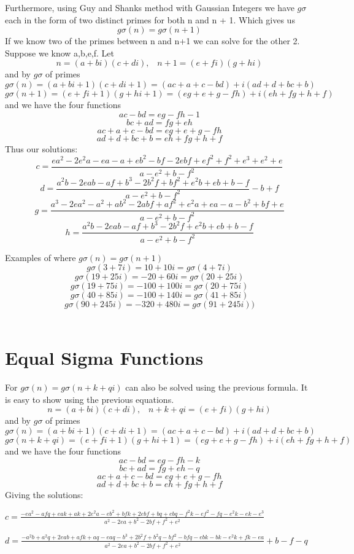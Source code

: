 \documentclass[12pt]{amsart}
\begin{document}
Furthermore, using Guy and Shanks method with Gaussian Integers we have $g\sigma$ each in the form of two distinct primes for both n and n + 1. Which gives us $$g\sigma(n) = g\sigma(n+1)$$ If we know two of the primes between n and n+1 we can solve for the other 2. Suppose we know a,b,e,f.
Let $$n = (a + bi)(c+di), \; \; \; n+1 = (e + fi)(g + hi)$$ and by $g\sigma$ of primes  $$ g\sigma(n) = (a + bi + 1)(c + di + 1) = (ac + a + c -bd) + i(ad + d + bc + b)$$ $$ g\sigma(n+1) = (e + fi + 1)(g + hi + 1) = (eg + e + g - fh) + i(eh + fg + h + f)$$ and we have the four functions $$ac -bd = eg -fh - 1$$ $$bc + ad = fg + eh$$ $$ac + a + c -bd = eg + e + g - fh$$ $$ad + d + bc + b = eh + fg + h + f$$
Thus our solutions: 
$$c = \frac{ea^2 - 2e^2a -ea -a + eb^2 -bf -2ebf + ef^2 + f^2 + e^3 + e^2 + e} {a-e^2+b-f^2}$$ 
$$d = \frac{a^2b - 2eab -af +b^3 -2b^2f + bf^2 + e^2b + eb + b - f}{a-e^2 + b -f^2} -b + f$$ 
$$g = \frac{a^3 -2ea^2 - a^2 + ab^2 - 2abf + af^2 + e^2a + ea - a -b^2 + bf + e} {a-e^2+b-f^2}$$ 
$$h = \frac{a^2b - 2eab -af + b^3 - 2b^2f + e^2b + eb +b -f} {a-e^2+b-f^2}$$


Examples of where $g\sigma(n) = g\sigma(n+1)$
\\
$$g\sigma(3 + 7i) = 10 + 10i = g\sigma(4 + 7i)$$
$$g\sigma(19 + 25i) = -20 + 60i = g\sigma(20 + 25i)$$
$$g\sigma(19 + 75i) = -100 + 100i = g\sigma(20 + 75i)$$
$$g\sigma(40 + 85i) = -100 + 140i  = g\sigma(41 + 85i)$$
$$g\sigma(90 + 245i) = -320 + 480i  = g\sigma(91 + 245i))$$
\\

\section{Equal Sigma Functions}
For $g\sigma(n) = g\sigma(n+k+qi)$ can also be solved using the previous formula. It is easy to show using the previous equations. 
$$n = (a + bi)(c+di), \; \; \; n+k+qi = (e + fi)(g + hi)$$ and by $g\sigma$ of primes $$ g\sigma(n) = (a + bi + 1)(c + di + 1) = (ac + a + c -bd) + i(ad + d + bc + b)$$ $$ g\sigma(n+k+qi) = (e + fi + 1)(g + hi + 1) = (eg + e + g - fh) + i(eh + fg + h + f)$$ and we have the four functions $$ac -bd = eg -fh - k$$ $$bc + ad = fg + eh - q$$ $$ac + a + c -bd = eg + e + g - fh$$ $$ad + d + bc + b = eh + fg + h + f$$
Giving the solutions:

$c = \frac{-ea^2 -afq + eak + ak + 2e^2a -eb^2 + bfk + 2ebf + bq + ebq -f^2k -ef^2 -fq-e^2k -ek -e^3}{a^2-2ea+b^2-2bf+f^2+e^2}$

$d = \frac{-a^2b+a^2q+2eab+afk+aq-eaq-b^3+2b^2f+b^2q-bf^2-bfq-ebk-bk-e^2k+fk-ea}{a^2-2ea+b^2-2bf+f^2+e^2} +b -f -q$
\end{document}
